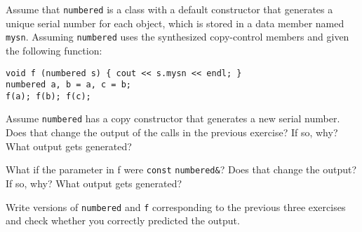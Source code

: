 %
%
\begin{question}
Assume that \verb|numbered| is a class with a default constructor
that generates a unique serial number for each object, which is stored in a
data member named \verb|mysn|. Assuming \verb|numbered| uses the synthesized copy-control
members and given the following function:
\begin{lstlisting}
void f (numbered s) { cout << s.mysn << endl; }
numbered a, b = a, c = b;
f(a); f(b); f(c);
\end{lstlisting}
\end{question}

\begin{question}
Assume \verb|numbered| has a copy constructor that generates a
new serial number. Does that change the output of the calls in the previous
exercise? If so, why? What output gets generated?
\end{question}

\begin{question}
What if the parameter in f were \verb|const| \verb|numbered&|?
Does that change the output? If so, why? What output gets generated?
\end{question}

\begin{question}
Write versions of \verb|numbered| and \verb|f| corresponding to the
previous three exercises and check whether you correctly predicted the
output.
\end{question}

